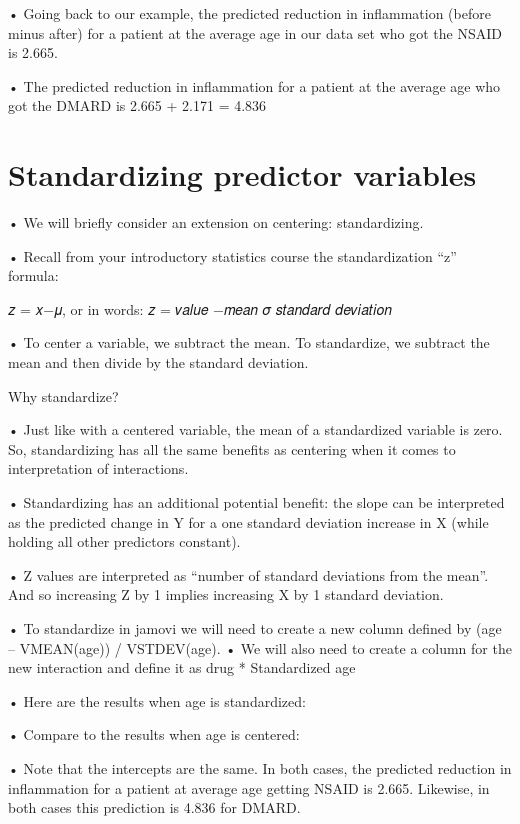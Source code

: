 \documentclass[
  letterpaper,
  DIV=11,
  numbers=noendperiod]{scrreprt}
\begin{document}
• Going back to our example, the predicted reduction in inflammation
(before minus after) for a patient at the average age in our data set
who got the NSAID is 2.665.

• The predicted reduction in inflammation for a patient at the average
age who got the DMARD is 2.665 + 2.171 = 4.836

\hypertarget{standardizing-predictor-variables}{%
\section{Standardizing predictor
variables}\label{standardizing-predictor-variables}}

• We will briefly consider an extension on centering: standardizing.

• Recall from your introductory statistics course the standardization
``z'' formula:

𝑧 = 𝑥−𝜇, or in words: 𝑧 = 𝑣𝑎𝑙𝑢𝑒 −𝑚𝑒𝑎𝑛 𝜎 𝑠𝑡𝑎𝑛𝑑𝑎𝑟𝑑 𝑑𝑒𝑣𝑖𝑎𝑡𝑖𝑜𝑛

• To center a variable, we subtract the mean. To standardize, we
subtract the mean and then divide by the standard deviation.

Why standardize?

• Just like with a centered variable, the mean of a standardized
variable is zero. So, standardizing has all the same benefits as
centering when it comes to interpretation of interactions.

• Standardizing has an additional potential benefit: the slope can be
interpreted as the predicted change in Y for a one standard deviation
increase in X (while holding all other predictors constant).

• Z values are interpreted as ``number of standard deviations from the
mean''. And so increasing Z by 1 implies increasing X by 1 standard
deviation.

• To standardize in jamovi we will need to create a new column defined
by (age -- VMEAN(age)) / VSTDEV(age). • We will also need to create a
column for the new interaction and define it as drug * Standardized age

• Here are the results when age is standardized:

• Compare to the results when age is centered:

• Note that the intercepts are the same. In both cases, the predicted
reduction in inflammation for a patient at average age getting NSAID is
2.665. Likewise, in both cases this prediction is 4.836 for DMARD.
\end{document}
